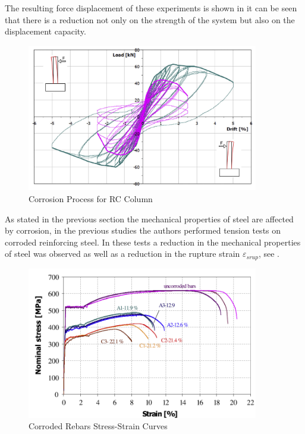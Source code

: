 The resulting force displacement of these experiments is shown in  it can be seen that there is a reduction not only on the strength of the system but also on the displacement capacity. 

\begin{figure}[htbp]
	\centering
	\includegraphics[width=0.9\textwidth]{Chapter-4/figs/Meda_F-D_01}
	\caption{Corrosion Process for RC Column \cite{Meda2014}}
	\label{fig:Meda_FD}
\end{figure}

As stated in the previous section the mechanical properties of steel are affected by corrosion, in the previous studies \cite{Meda2014} the authors performed tension tests on corroded reinforcing steel. In these tests a reduction in the mechanical properties of steel was observed as well as a reduction in the rupture strain $\varepsilon_{srup}$, see . 

\begin{figure}[htbp]
	\centering
	\includegraphics[width=0.9\textwidth]{Chapter-4/figs/Meda_StressStrain}
	\caption{Corroded Rebars Stress-Strain Curves \cite{Meda2014}}
	\label{fig:Meda_RebarTest}
\end{figure}

